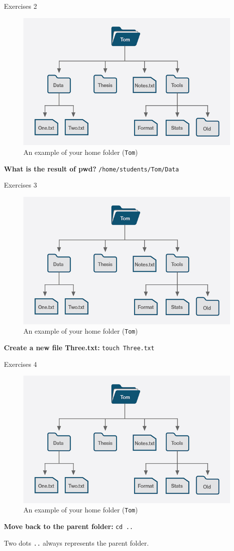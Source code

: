 \documentclass{beamer}
\begin{document}
\begin{frame}{Exercises 2}
	\begin{figure}
		\centering
		\includegraphics[width=0.7\linewidth]{00shell}
		\caption{An example of your home folder (\texttt{Tom})}
		\label{fig:00shell}
	\end{figure}
	\textbf{What is the result of pwd?} \pause \texttt{/home/students/Tom/Data}
\end{frame}

\begin{frame}{Exercises 3}
	\begin{figure}
		\centering
		\includegraphics[width=0.7\linewidth]{00shell}
		\caption{An example of your home folder (\texttt{Tom})}
		\label{fig:00shell}
	\end{figure}
	\textbf{Create a new file Three.txt:} \pause \texttt{touch Three.txt}
\end{frame}

\begin{frame}{Exercises 4}
	\begin{figure}
		\centering
		\includegraphics[width=0.7\linewidth]{00shell}
		\caption{An example of your home folder (\texttt{Tom})}
		\label{fig:00shell}
	\end{figure}
	\textbf{Move back to the parent folder:} \pause \texttt{cd ..}
	
	Two dots \texttt{..} always represents the parent folder.
\end{frame}
\end{document}
